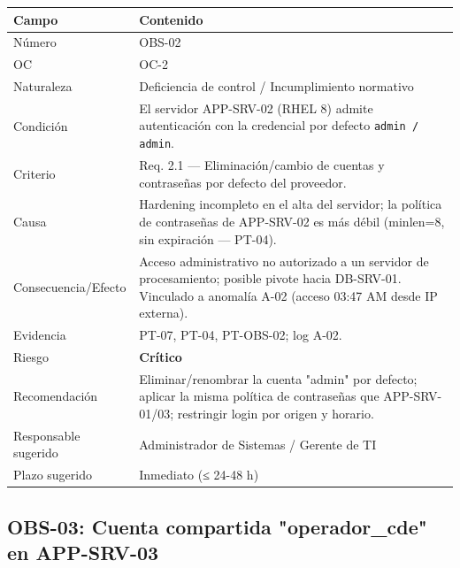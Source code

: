 \documentclass[11pt,a4paper]{article}
\begin{document}
\begin{tabularx}{\textwidth}{P{5cm}L}
\toprule
\textbf{Campo} & \textbf{Contenido} \\
\midrule
Número & OBS-02 \\
OC & OC-2 \\
Naturaleza & Deficiencia de control / Incumplimiento normativo \\
Condición & El servidor APP-SRV-02 (RHEL 8) admite autenticación con la credencial por defecto \texttt{admin / admin}. \\
Criterio & Req. 2.1 — Eliminación/cambio de cuentas y contraseñas por defecto del proveedor. \\
Causa & Hardening incompleto en el alta del servidor; la política de contraseñas de APP-SRV-02 es más débil (minlen=8, sin expiración — PT-04). \\
Consecuencia/Efecto & Acceso administrativo no autorizado a un servidor de procesamiento; posible pivote hacia DB-SRV-01. Vinculado a anomalía A-02 (acceso 03:47 AM desde IP externa). \\
Evidencia & PT-07, PT-04, PT-OBS-02; log A-02. \\
Riesgo & \textbf{Crítico} \\
Recomendación & Eliminar/renombrar la cuenta "admin" por defecto; aplicar la misma política de contraseñas que APP-SRV-01/03; restringir login por origen y horario. \\
Responsable sugerido & Administrador de Sistemas / Gerente de TI \\
Plazo sugerido & Inmediato (≤ 24-48 h) \\
\bottomrule
\end{tabularx}

\subsection{OBS-03: Cuenta compartida "operador_cde" en APP-SRV-03}
\end{document}
